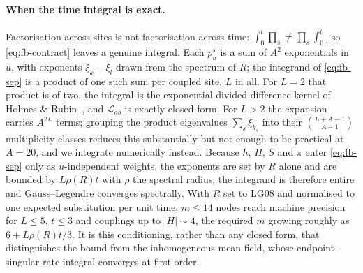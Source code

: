 \paragraph{When the time integral is exact.} Factorisation across sites is not
factorisation across time: $\int_0^t \prod_{s} \neq \prod_{s} \int_0^t$, so
\eqref{eq:fb-contract} leaves a genuine integral. Each $p^s_u$ is a sum of $A^2$
exponentials in $u$, with exponents $\xi_k - \xi_l$ drawn from the spectrum of
$R$; the integrand of \eqref{eq:fb-sep} is a product of one such sum per coupled
site, $L$ in all. For $L = 2$ that product is of two, the integral is the
exponential divided-difference kernel of Holmes \& Rubin~\citep{HolmesRubin2002},
and $\mathcal{L}_{ab}$ is exactly closed-form. For $L > 2$ the expansion carries
$A^{2L}$ terms; grouping the product eigenvalues $\sum_s \xi_{k_s}$ into their
$\binom{L+A-1}{A-1}$ multiplicity classes reduces this substantially but not
enough to be practical at $A = 20$, and we integrate numerically instead.
Because $h$, $H$, $S$ and $\pi$ enter \eqref{eq:fb-sep} only as $u$-independent
weights, the exponents are set by $R$ alone and are bounded by $L\rho(R)t$ with
$\rho$ the spectral radius; the integrand is therefore entire and
Gauss--Legendre converges spectrally. With $R$ set to LG08 and normalised to one
expected substitution per unit time, $m \leq 14$ nodes reach machine precision
for $L \leq 5$, $t \leq 3$ and couplings up to $|H| \sim 4$, the required $m$
growing roughly as $6 + L\rho(R)t/3$. It is this conditioning, rather than any
closed form, that distinguishes the bound from the inhomogeneous mean field,
whose endpoint-singular rate integral converges at first order.


